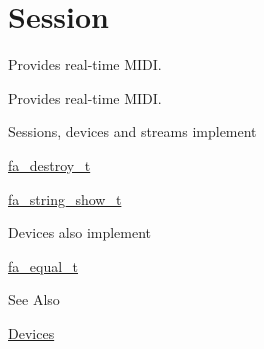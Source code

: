 \hypertarget{group___fa_midi_session}{\section{Session}
\label{group___fa_midi_session}
}


Provides real-\/time M\-I\-D\-I.  


Provides real-\/time M\-I\-D\-I. \begin{DoxyParagraph}{Sessions, devices and streams implement }

\begin{DoxyItemize}
\item \hyperlink{structfa__destroy__t}{fa\-\_\-destroy\-\_\-t}
\item \hyperlink{structfa__string__show__t}{fa\-\_\-string\-\_\-show\-\_\-t}
\end{DoxyItemize}
\end{DoxyParagraph}
\begin{DoxyParagraph}{Devices also implement }

\begin{DoxyItemize}
\item \hyperlink{structfa__equal__t}{fa\-\_\-equal\-\_\-t}
\end{DoxyItemize}
\end{DoxyParagraph}
\begin{DoxySeeAlso}{See Also}

\begin{DoxyItemize}
\item \hyperlink{md__devices_Devices}{Devices} 
\end{DoxyItemize}
\end{DoxySeeAlso}
